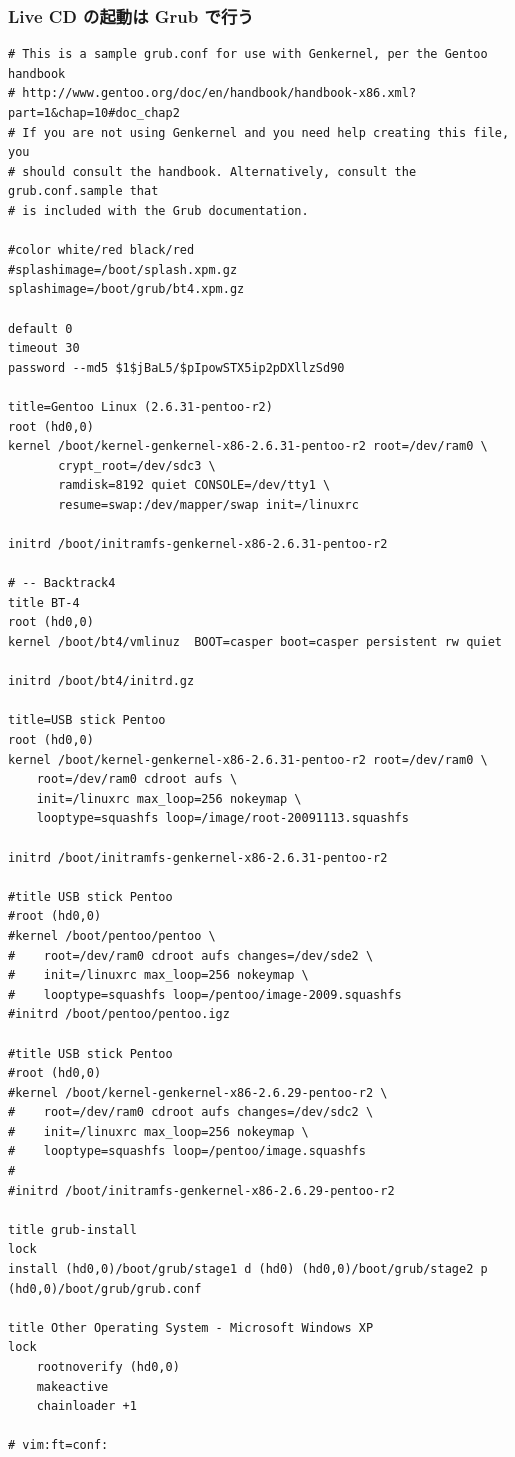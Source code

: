 \documentclass[11pt]{article}
\begin{document}
\subsubsection{Live CD の起動は Grub で行う}
\label{sec:orgb9dcb18}
\begin{verbatim}
# This is a sample grub.conf for use with Genkernel, per the Gentoo handbook
# http://www.gentoo.org/doc/en/handbook/handbook-x86.xml?part=1&chap=10#doc_chap2
# If you are not using Genkernel and you need help creating this file, you
# should consult the handbook. Alternatively, consult the grub.conf.sample that
# is included with the Grub documentation.

#color white/red black/red
#splashimage=/boot/splash.xpm.gz
splashimage=/boot/grub/bt4.xpm.gz

default 0
timeout 30
password --md5 $1$jBaL5/$pIpowSTX5ip2pDXllzSd90

title=Gentoo Linux (2.6.31-pentoo-r2)
root (hd0,0)
kernel /boot/kernel-genkernel-x86-2.6.31-pentoo-r2 root=/dev/ram0 \
       crypt_root=/dev/sdc3 \
       ramdisk=8192 quiet CONSOLE=/dev/tty1 \
       resume=swap:/dev/mapper/swap init=/linuxrc

initrd /boot/initramfs-genkernel-x86-2.6.31-pentoo-r2

# -- Backtrack4
title BT-4
root (hd0,0)
kernel /boot/bt4/vmlinuz  BOOT=casper boot=casper persistent rw quiet

initrd /boot/bt4/initrd.gz

title=USB stick Pentoo
root (hd0,0)
kernel /boot/kernel-genkernel-x86-2.6.31-pentoo-r2 root=/dev/ram0 \
    root=/dev/ram0 cdroot aufs \
    init=/linuxrc max_loop=256 nokeymap \
    looptype=squashfs loop=/image/root-20091113.squashfs

initrd /boot/initramfs-genkernel-x86-2.6.31-pentoo-r2

#title USB stick Pentoo
#root (hd0,0)
#kernel /boot/pentoo/pentoo \
#    root=/dev/ram0 cdroot aufs changes=/dev/sde2 \
#    init=/linuxrc max_loop=256 nokeymap \
#    looptype=squashfs loop=/pentoo/image-2009.squashfs
#initrd /boot/pentoo/pentoo.igz

#title USB stick Pentoo
#root (hd0,0)
#kernel /boot/kernel-genkernel-x86-2.6.29-pentoo-r2 \
#    root=/dev/ram0 cdroot aufs changes=/dev/sdc2 \
#    init=/linuxrc max_loop=256 nokeymap \
#    looptype=squashfs loop=/pentoo/image.squashfs
#
#initrd /boot/initramfs-genkernel-x86-2.6.29-pentoo-r2

title grub-install
lock
install (hd0,0)/boot/grub/stage1 d (hd0) (hd0,0)/boot/grub/stage2 p (hd0,0)/boot/grub/grub.conf

title Other Operating System - Microsoft Windows XP
lock
    rootnoverify (hd0,0)
    makeactive
    chainloader +1

# vim:ft=conf:
\end{verbatim}
\end{document}
